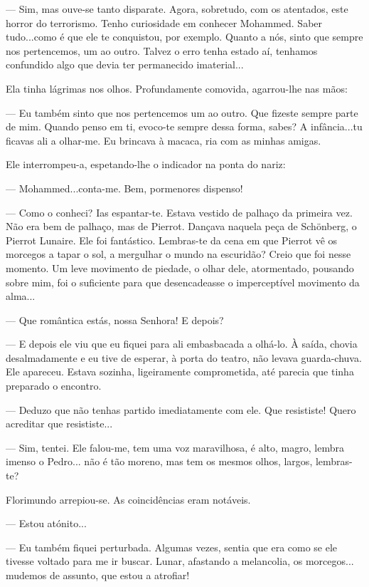 --- Sim, mas ouve-se tanto disparate. Agora, sobretudo, com os atentados,
este horror do terrorismo. Tenho curiosidade em conhecer Mohammed. Saber
tudo...como é que ele te conquistou, por exemplo. Quanto a nós, sinto
que sempre nos pertencemos, um ao outro. Talvez o erro tenha estado aí,
tenhamos confundido algo que devia ter permanecido imaterial...

Ela tinha lágrimas nos olhos. Profundamente comovida, agarrou-lhe nas
mãos:

--- Eu também sinto que nos pertencemos um ao outro. Que fizeste sempre
parte de mim. Quando penso em ti, evoco-te sempre dessa forma, sabes? A
infância...tu ficavas ali a olhar-me. Eu brincava à macaca, ria com as
minhas amigas.

Ele interrompeu-a, espetando-lhe o indicador na ponta do nariz:

--- Mohammed...conta-me. Bem, pormenores dispenso!

--- Como o conheci? Ias espantar-te. Estava vestido de palhaço da primeira
vez. Não era bem de palhaço, mas de Pierrot. Dançava naquela peça de
Schönberg, o Pierrot Lunaire. Ele foi fantástico. Lembras-te da cena em
que Pierrot vê os morcegos a tapar o sol, a mergulhar o mundo na
escuridão? Creio que foi nesse momento. Um leve movimento de piedade, o
olhar dele, atormentado, pousando sobre mim, foi o suficiente para que
desencadeasse o imperceptível movimento da alma...

--- Que romântica estás, nossa Senhora! E depois?

--- E depois ele viu que eu fiquei para ali embasbacada a olhá-lo. À
saída, chovia desalmadamente e eu tive de esperar, à porta do teatro,
não levava guarda-chuva. Ele apareceu. Estava sozinha, ligeiramente
comprometida, até parecia que tinha preparado o encontro.

--- Deduzo que não tenhas partido imediatamente com ele. Que resististe!
Quero acreditar que resististe...

--- Sim, tentei. Ele falou-me, tem uma voz maravilhosa, é alto, magro,
lembra imenso o Pedro... não é tão moreno, mas tem os mesmos olhos,
largos, lembras-te?

Florimundo arrepiou-se. As coincidências eram notáveis.

--- Estou atónito...

--- Eu também fiquei perturbada. Algumas vezes, sentia que era como se ele
tivesse voltado para me ir buscar. Lunar, afastando a melancolia, os
morcegos... mudemos de assunto, que estou a atrofiar!

